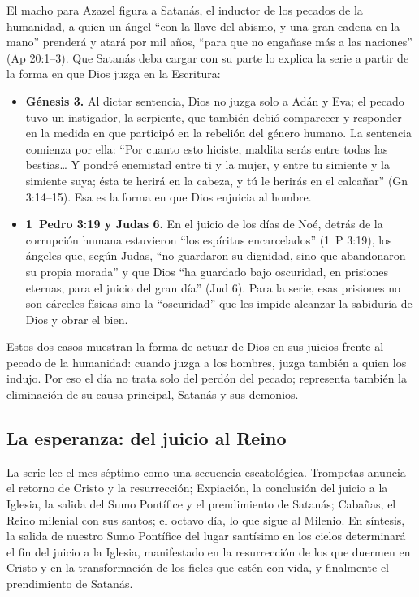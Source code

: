 \documentclass[11pt,letterpaper]{article}
\begin{document}
El macho para Azazel figura a Satanás, el inductor de los pecados de la humanidad, a quien un ángel ``con la llave del abismo, y una gran cadena en la mano'' prenderá y atará por mil años, ``para que no engañase más a las naciones'' (Ap 20:1--3). Que Satanás deba cargar con su parte lo explica la serie a partir de la forma en que Dios juzga en la Escritura:

\begin{itemize}\setlength{\itemsep}{2pt}
\item \textbf{Génesis 3.} Al dictar sentencia, Dios no juzga solo a Adán y Eva; el pecado tuvo un instigador, la serpiente, que también debió comparecer y responder en la medida en que participó en la rebelión del género humano. La sentencia comienza por ella: ``Por cuanto esto hiciste, maldita serás entre todas las bestias\ldots{} Y pondré enemistad entre ti y la mujer, y entre tu simiente y la simiente suya; ésta te herirá en la cabeza, y tú le herirás en el calcañar'' (Gn 3:14--15). Esa es la forma en que Dios enjuicia al hombre.
\item \textbf{1~Pedro 3:19 y Judas 6.} En el juicio de los días de Noé, detrás de la corrupción humana estuvieron ``los espíritus encarcelados'' (1~P 3:19), los ángeles que, según Judas, ``no guardaron su dignidad, sino que abandonaron su propia morada'' y que Dios ``ha guardado bajo oscuridad, en prisiones eternas, para el juicio del gran día'' (Jud 6). Para la serie, esas prisiones no son cárceles físicas sino la ``oscuridad'' que les impide alcanzar la sabiduría de Dios y obrar el bien.
\end{itemize}

Estos dos casos muestran la forma de actuar de Dios en sus juicios frente al pecado de la humanidad: cuando juzga a los hombres, juzga también a quien los indujo. Por eso el día no trata solo del perdón del pecado; representa también la eliminación de su causa principal, Satanás y sus demonios.

\subsection{La esperanza: del juicio al Reino}
La serie lee el mes séptimo como una secuencia escatológica. Trompetas anuncia el retorno de Cristo y la resurrección; Expiación, la conclusión del juicio a la Iglesia, la salida del Sumo Pontífice y el prendimiento de Satanás; Cabañas, el Reino milenial con sus santos; el octavo día, lo que sigue al Milenio. En síntesis, la salida de nuestro Sumo Pontífice del lugar santísimo en los cielos determinará el fin del juicio a la Iglesia, manifestado en la resurrección de los que duermen en Cristo y en la transformación de los fieles que estén con vida, y finalmente el prendimiento de Satanás.
\end{document}
